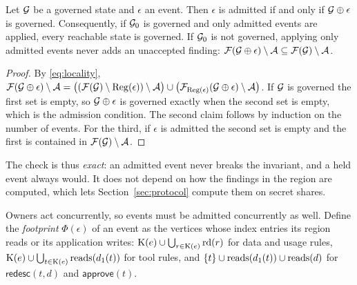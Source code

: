 \begin{theorem}\label{thm:preservation}
Let $\mathcal{G}$ be a governed state and $\epsilon$ an event. Then $\epsilon$ is admitted if and only if $\mathcal{G} \oplus \epsilon$ is governed. Consequently, if $\mathcal{G}_0$ is governed and only admitted events are applied, every reachable state is governed. If $\mathcal{G}_0$ is not governed, applying only admitted events never adds an unaccepted finding: $\mathcal{F}(\mathcal{G} \oplus \epsilon) \setminus \mathcal{A} \subseteq \mathcal{F}(\mathcal{G}) \setminus \mathcal{A}$.
\end{theorem}
\begin{proof}
By \eqref{eq:locality}, $\mathcal{F}(\mathcal{G} \oplus \epsilon) \setminus \mathcal{A} = \bigl((\mathcal{F}(\mathcal{G}) \setminus \mathrm{Reg}(\epsilon)) \setminus \mathcal{A}\bigr) \cup \bigl(\mathcal{F}_{\mathrm{Reg}(\epsilon)}(\mathcal{G} \oplus \epsilon) \setminus \mathcal{A}\bigr)$. If $\mathcal{G}$ is governed the first set is empty, so $\mathcal{G} \oplus \epsilon$ is governed exactly when the second set is empty, which is the admission condition. The second claim follows by induction on the number of events. For the third, if $\epsilon$ is admitted the second set is empty and the first is contained in $\mathcal{F}(\mathcal{G}) \setminus \mathcal{A}$.
\end{proof}
The check is thus \emph{exact}: an admitted event never breaks the invariant, and a held event always would. It does not depend on how the findings in the region are computed, which lets Section~\ref{sec:protocol} compute them on secret shares.

Owners act concurrently, so events must be admitted concurrently as well. Define the \emph{footprint} $\Phi(\epsilon)$ of an event as the vertices whose index entries its region reads or its application writes: $\mathrm{K}(e) \cup \bigcup_{r \in \mathrm{K}(e)} \mathrm{rd}(r)$ for data and usage rules, $\mathrm{K}(e) \cup \bigcup_{t \in \mathrm{K}(e)} \mathrm{reads}(d_1(t))$ for tool rules, and $\{t\} \cup \mathrm{reads}(d_1(t)) \cup \mathrm{reads}(d)$ for $\mathsf{redesc}(t, d)$ and $\mathsf{approve}(t)$.

